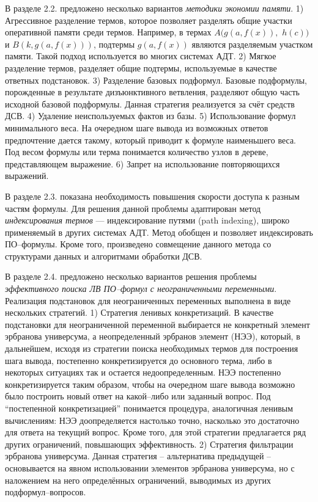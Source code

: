 \documentclass[a4paper]{report}
\begin{document}
В разделе 2.2. предложено несколько вариантов \emph{методики экономии памяти}. 1) Агрессивное разделение термов, которое позволяет разделять общие участки оперативной памяти среди термов. Например, в термах $A(g(a,f(x)),$ $h(c))$ и $B(k,g(a,f(x)))$, подтермы $g(a,f(x))$ являются разделяемым участком памяти. Такой подход используется во многих системах АДТ. 2) Мягкое разделение термов, разделяет общие подтермы, используемые в качестве ответных подстановок. 3) Разделение базовых подформул. Базовые подформулы, порожденные в результате дизъюнктивного ветвления, разделяют общую часть исходной базовой подформулы. Данная стратегия реализуется за счёт средств ДСВ. 4) Удаление неиспользуемых фактов из базы. 5) Использование формул минимального веса. На очередном шаге вывода из возможных ответов предпочтение дается такому, который приводит к формуле наименьшего веса. Под весом формулы или терма понимается количество узлов в дереве, представляющем выражение. 6) Запрет на использование повторяющихся выражений.

В разделе 2.3. показана необходимость повышения скорости доступа к разным частям формулы. Для решения данной проблемы адаптирован метод \emph{индексирования термов} --- индексирование путями (path indexing), широко применяемый в других системах АДТ. Метод обобщен и позволяет индексировать ПО--формулы. Кроме того, произведено совмещение данного метода со структурами данных и алгоритмами обработки ДСВ.

В разделе 2.4. предложено несколько вариантов решения проблемы \emph{эффективного поиска ЛВ ПО--формул с неограниченными переменными}. Реализация подстановок для неограниченных переменных выполнена в виде нескольких стратегий. 1) Стратегия ленивых конкретизаций. В качестве подстановки для неограниченной переменной выбирается не конкретный элемент эрбранова универсума, а неопределенный эрбранов элемент (НЭЭ), который, в дальнейшем, исходя из стратегии поиска необходимых термов для построения шага вывода, постепенно конкретизируется до основного терма, либо в некоторых ситуациях так и остается недоопределенным. НЭЭ постепенно конкретизируется таким образом, чтобы на очередном шаге вывода возможно было построить новый ответ на какой--либо или заданный вопрос. Под ``постепенной конкретизацией'' понимается процедура, аналогичная ленивым вычислениям: НЭЭ доопределяется настолько точно, насколько это достаточно для ответа на текущий вопрос. Кроме того, для этой стратегии предлагается ряд других ограничений, повышающих эффективность.  2) Стратегия фильтрации эрбранова универсума. Данная стратегия -- альтернатива предыдущей -- основывается на явном использовании элементов эрбранова универсума, но с наложением на него определённых ограничений, выводимых из других подформул--вопросов.
\end{document}
